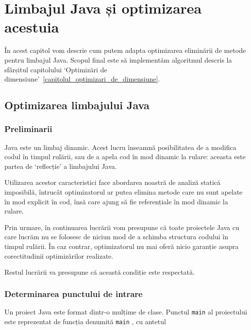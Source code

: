 \chapter{Limbajul Java și optimizarea acestuia}

În acest capitol vom descrie cum putem adapta optimizarea eliminării de metode pentru limbajul Java.
Scopul final este să implementăm algoritmul descris la sfârșitul capitolului `Optimizări de dimensiune'~\ref{capitolul_optimizari_de_dimensiune}.

\section{Optimizarea limbajului Java}


\subsection{Preliminarii}

Java este un limbaj dinamic. Acest lucru înseamnă posibilitatea de a modifica
codul în timpul rulării, sau de a apela cod în mod dinamic la rulare: aceasta
este partea de `reflecție' a limbajului Java.

Utilizarea acestor caracteristici face abordarea noastră de analiză
statică imposibilă, întrucât optimizatorul ar putea elimina metode care nu sunt
apelate în mod explicit în cod, însă care ajung să fie referențiale în mod
dinamic la rulare.

Prin urmare, în continuarea lucrării vom presupune că toate proiectele Java cu
care lucrăm nu se folosesc de niciun mod de a schimba structura codului în
timpul rulării. În caz contrar, optimizatorul nu mai oferă nicio garanție asupra
corectitudinii optimizărilor realizate.

Restul lucrării va presupune că această condiție este respectată.


\subsection{Determinarea punctului de intrare}

Un proiect Java este format dintr-o mulțime de clase.
Punctul \texttt{main} al proiectului este reprezentat de funcția
denumită \texttt{main} \cite{java_main}, cu antetul

